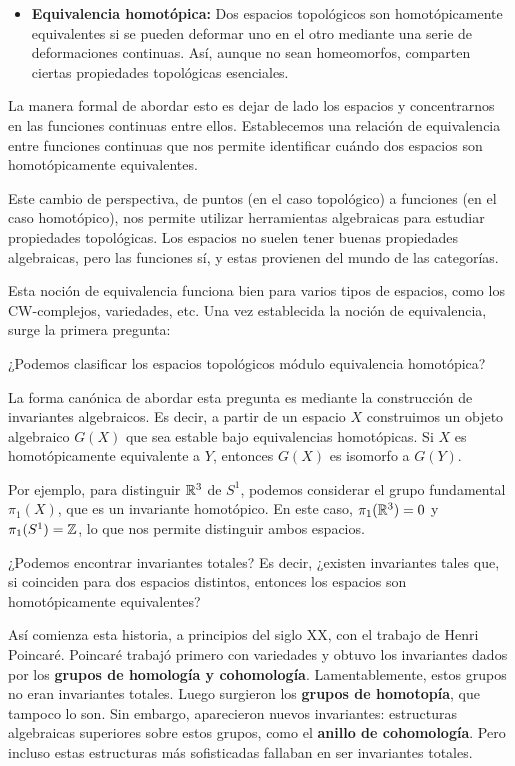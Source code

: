\begin{itemize}
    \item \textbf{Equivalencia homotópica:} Dos espacios topológicos son homotópicamente equivalentes si se pueden deformar uno en el otro mediante una serie de deformaciones continuas. Así, aunque no sean homeomorfos, comparten ciertas propiedades topológicas esenciales.
\end{itemize}

La manera formal de abordar esto es dejar de lado los espacios y concentrarnos en las funciones continuas entre ellos. Establecemos una relación de equivalencia entre funciones continuas que nos permite identificar cuándo dos espacios son homotópicamente equivalentes.

Este cambio de perspectiva, de puntos (en el caso topológico) a funciones (en el caso homotópico), nos permite utilizar herramientas algebraicas para estudiar propiedades topológicas. Los espacios no suelen tener buenas propiedades algebraicas, pero las funciones sí, y estas provienen del mundo de las categorías.

Esta noción de equivalencia funciona bien para varios tipos de espacios, como los CW-complejos, variedades, etc. Una vez establecida la noción de equivalencia, surge la primera pregunta:

\begin{pregunta}
    ¿Podemos clasificar los espacios topológicos módulo equivalencia homotópica?
\end{pregunta}

La forma canónica de abordar esta pregunta es mediante la construcción de invariantes algebraicos. Es decir, a partir de un espacio $X$ construimos un objeto algebraico $G(X)$ que sea estable bajo equivalencias homotópicas. Si $X$ es homotópicamente equivalente a $Y$, entonces $G(X)$ es isomorfo a $G(Y)$.

Por ejemplo, para distinguir $\mathbb R^3$ de $S^1$, podemos considerar el grupo fundamental $\pi_1(X)$, que es un invariante homotópico. En este caso, $\pi_1(\mathbb R^3) = 0$ y $\pi_1(S^1) = \mathbb Z$, lo que nos permite distinguir ambos espacios.

\begin{pregunta}
    ¿Podemos encontrar invariantes totales? Es decir, ¿existen invariantes tales que, si coinciden para dos espacios distintos, entonces los espacios son homotópicamente equivalentes?
\end{pregunta}

Así comienza esta historia, a principios del siglo XX, con el trabajo de Henri Poincaré. Poincaré trabajó primero con variedades y obtuvo los invariantes dados por los \textbf{grupos de homología y cohomología}. Lamentablemente, estos grupos no eran invariantes totales. Luego surgieron los \textbf{grupos de homotopía}, que tampoco lo son. Sin embargo, aparecieron nuevos invariantes: estructuras algebraicas superiores sobre estos grupos, como el \textbf{anillo de cohomología}. Pero incluso estas estructuras más sofisticadas fallaban en ser invariantes totales.

